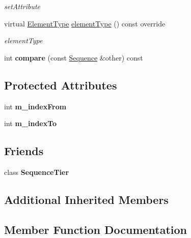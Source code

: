 \begin{DoxyCompactItemize}
\begin{DoxyCompactList}\small\item\em set\+Attribute \end{DoxyCompactList}\item 
virtual \hyperlink{class_annotation_element_af5282990ffbe25eeea8ab02037e344b0}{Element\+Type} \hyperlink{class_sequence_a09f57e396cbb4a9de8caa81ca3b96ad1}{element\+Type} () const override
\begin{DoxyCompactList}\small\item\em element\+Type \end{DoxyCompactList}\item 
\mbox{\label{class_sequence_ac60a029ededf52b751ca6816d9bcc6a8}} 
int {\bfseries compare} (const \hyperlink{class_sequence}{Sequence} \&other) const
\end{DoxyCompactItemize}
\subsection*{Protected Attributes}
\begin{DoxyCompactItemize}
\item 
\mbox{\label{class_sequence_ad5343489162de6c1e2f6f141f9e46176}} 
int {\bfseries m\+\_\+index\+From}
\item 
\mbox{\label{class_sequence_a1a9b44ccaf29fe0be09aa981801af36e}} 
int {\bfseries m\+\_\+index\+To}
\end{DoxyCompactItemize}
\subsection*{Friends}
\begin{DoxyCompactItemize}
\item 
\mbox{\label{class_sequence_a6781e2c8fe5fcdb7684545a10e8f28a0}} 
class {\bfseries Sequence\+Tier}
\end{DoxyCompactItemize}
\subsection*{Additional Inherited Members}


\subsection{Member Function Documentation}
\mbox{\label{class_sequence_a415f655b5985fa47499a7f665ce7c2d4}} 
